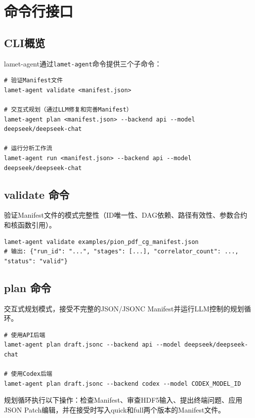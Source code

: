 \documentclass[12pt,a4paper]{ctexart}
\begin{document}
\section{命令行接口}

\subsection{CLI概览}

lamet-agent通过\texttt{lamet-agent}命令提供三个子命令：

\begin{lstlisting}[caption={CLI命令概览}]
# 验证Manifest文件
lamet-agent validate <manifest.json>

# 交互式规划（通过LLM修复和完善Manifest）
lamet-agent plan <manifest.json> --backend api --model deepseek/deepseek-chat

# 运行分析工作流
lamet-agent run <manifest.json> --backend api --model deepseek/deepseek-chat
\end{lstlisting}

\subsection{validate 命令}

验证Manifest文件的模式完整性（ID唯一性、DAG依赖、路径有效性、参数合约和核函数引用）。

\begin{lstlisting}[caption={validate 命令用法}]
lamet-agent validate examples/pion_pdf_cg_manifest.json
# 输出: {"run_id": "...", "stages": [...], "correlator_count": ..., "status": "valid"}
\end{lstlisting}

\subsection{plan 命令}

交互式规划模式，接受不完整的JSON/JSONC Manifest并运行LLM控制的规划循环。

\begin{lstlisting}[caption={plan 命令用法}]
# 使用API后端
lamet-agent plan draft.jsonc --backend api --model deepseek/deepseek-chat

# 使用Codex后端
lamet-agent plan draft.jsonc --backend codex --model CODEX_MODEL_ID
\end{lstlisting}

规划循环执行以下操作：检查Manifest、审查HDF5输入、提出终端问题、应用JSON Patch编辑，并在接受时写入quick和full两个版本的Manifest文件。
\end{document}
